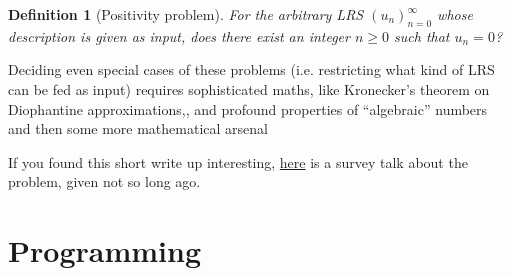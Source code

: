 \documentclass{article}
\theoremstyle{definition}
\newtheorem{definition}{Definition}[section]
\begin{document}
\begin{definition}[Positivity problem]
\emph{For the arbitrary LRS $(u_n)_{n=0}^{\infty}$ whose description is given as input, does there exist an integer $n \geq 0$ such that $u_n = 0$?}
\end{definition}

Deciding even special cases of these problems (i.e. restricting what kind of LRS can be fed as input) requires sophisticated maths, like Kronecker’s theorem on Diophantine approximations,\cite[][Chap. 7, Sec. 1.3, Prop. 7]{bourbaki1966general}, and profound properties of “algebraic” numbers \cite{mignotte1982some} and then some more mathematical arsenal \cite{bell2007positivity,renegar1992computational}

If you found this short write up interesting, \href{https://fmindia.cmi.ac.in/update2013/presentations/S-Akshay.pdf}{here} is a survey talk about the problem, given not so long ago.

\section{Programming}
\end{document}

